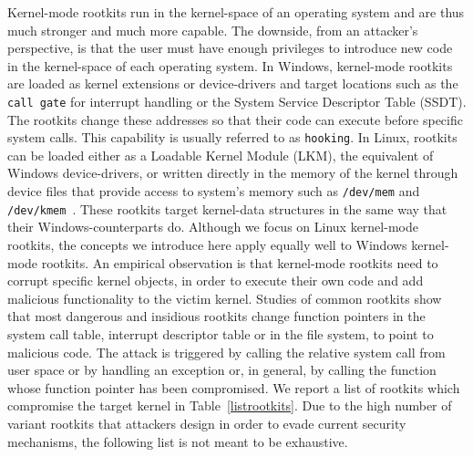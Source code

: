 Kernel-mode rootkits run in the kernel-space of an operating system and are thus much stronger and much more capable. The downside, from an attacker's perspective, is that the user must have enough privileges to introduce new code in the kernel-space of each operating system. In Windows, kernel-mode rootkits are loaded as kernel extensions or device-drivers and target locations such as the \texttt{call gate} for interrupt handling or the System Service Descriptor Table (SSDT).
The rootkits change these addresses so that their code can execute before specific system calls. This capability is usually referred to as \texttt{hooking}. In Linux, rootkits can be loaded either as a Loadable Kernel Module (LKM), the equivalent of Windows device-drivers, or written directly in the memory of the kernel through device files that provide access to system's memory such as \texttt{/dev/mem} and \texttt{/dev/kmem}~\cite{kmemRootkit}. These rootkits target kernel-data structures in the same way that their Windows-counterparts do. Although we focus on Linux kernel-mode rootkits, the concepts we introduce here apply equally well to Windows kernel-mode rootkits.
An empirical observation is that kernel-mode rootkits need to corrupt specific kernel objects, in order to execute their own code and add malicious functionality to the victim kernel.
Studies of common rootkits \cite{packetstorm,4} show that most dangerous and insidious rootkits change function pointers in the system call table, interrupt descriptor table or in the file system, to point to malicious code. The attack is triggered by calling the relative system call from user space or by handling an exception or, in general, by calling the function whose function pointer has been compromised.
We report a list of rootkits which compromise the target kernel in Table~\ref{listrootkits}. 
Due to the high number of variant rootkits that attackers design in order to evade current security mechanisms, the following list is not meant to be exhaustive.

\setlength{\textfloatsep}{0.5mm}
\begin{table}%
\begin{center}

\end{center}
\caption{Hooking methods of common linux rootkits}
\label{listrootkits}
\end{table}
\

